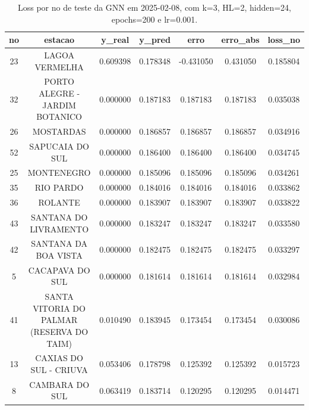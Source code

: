\begin{table}[h]
\centering
\caption{Loss por no de teste da GNN em 2025-02-08, com k=3, HL=2, hidden=24, epochs=200 e lr=0.001.}
\label{tab:gnn_loss_k3_hl2_h24_e200_d20250208}
\begin{tabular}{ccccccc}
\toprule
no & estacao & y\_real & y\_pred & erro & erro\_abs & loss\_no \\
\midrule
23 & LAGOA VERMELHA & 0.609398 & 0.178348 & -0.431050 & 0.431050 & 0.185804 \\
32 & PORTO ALEGRE - JARDIM BOTANICO & 0.000000 & 0.187183 & 0.187183 & 0.187183 & 0.035038 \\
26 & MOSTARDAS & 0.000000 & 0.186857 & 0.186857 & 0.186857 & 0.034916 \\
52 & SAPUCAIA DO SUL & 0.000000 & 0.186400 & 0.186400 & 0.186400 & 0.034745 \\
25 & MONTENEGRO & 0.000000 & 0.185096 & 0.185096 & 0.185096 & 0.034261 \\
35 & RIO PARDO & 0.000000 & 0.184016 & 0.184016 & 0.184016 & 0.033862 \\
36 & ROLANTE & 0.000000 & 0.183907 & 0.183907 & 0.183907 & 0.033822 \\
43 & SANTANA DO LIVRAMENTO & 0.000000 & 0.183247 & 0.183247 & 0.183247 & 0.033580 \\
42 & SANTANA DA BOA VISTA & 0.000000 & 0.182475 & 0.182475 & 0.182475 & 0.033297 \\
5 & CACAPAVA DO SUL & 0.000000 & 0.181614 & 0.181614 & 0.181614 & 0.032984 \\
41 & SANTA VITORIA DO PALMAR (RESERVA DO TAIM) & 0.010490 & 0.183945 & 0.173454 & 0.173454 & 0.030086 \\
13 & CAXIAS DO SUL - CRIUVA & 0.053406 & 0.178798 & 0.125392 & 0.125392 & 0.015723 \\
8 & CAMBARA DO SUL & 0.063419 & 0.183714 & 0.120295 & 0.120295 & 0.014471 \\
\bottomrule
\end{tabular}
\end{table}
